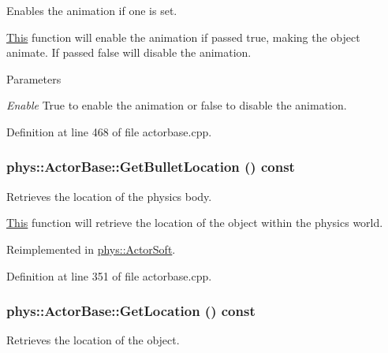Enables the animation if one is set. 

\hyperlink{structThis}{This} function will enable the animation if passed true, making the object animate. If passed false will disable the animation. 
\begin{DoxyParams}{Parameters}
\item[{\em Enable}]True to enable the animation or false to disable the animation. \end{DoxyParams}


Definition at line 468 of file actorbase.cpp.

\hypertarget{classphys_1_1ActorBase_a9b32df1efdc346f5d6c0920b959c09a3}{
\subsubsection[{GetBulletLocation}]{ phys::ActorBase::GetBulletLocation () const}}
\label{d8/d0f/classphys_1_1ActorBase_a9b32df1efdc346f5d6c0920b959c09a3}


Retrieves the location of the physics body. 

\hyperlink{structThis}{This} function will retrieve the location of the object within the physics world. 

Reimplemented in \hyperlink{classphys_1_1ActorSoft_a2b30f96cb01df382a774dfae5200fed0}{phys::ActorSoft}.



Definition at line 351 of file actorbase.cpp.

\hypertarget{classphys_1_1ActorBase_a777b4ea4d6881af76c646b1ba9324d96}{
\subsubsection[{GetLocation}]{ phys::ActorBase::GetLocation () const}}
\label{d8/d0f/classphys_1_1ActorBase_a777b4ea4d6881af76c646b1ba9324d96}


Retrieves the location of the object. 


